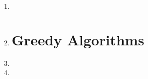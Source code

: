 \documentclass[11pt]{article}
\begin{document}
\begin{enumerate}
	\item 

	\item 
	
\newpage
\section*{Greedy Algorithms}
	\item 
	
	\vspace{.25in}
	
	\item 

\end{enumerate}
\end{document}
